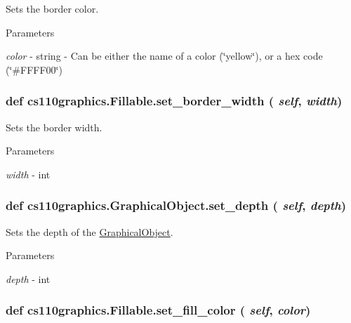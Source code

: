 Sets the border color. 
\begin{DoxyParams}{Parameters}
\item[{\em color}]-\/ string -\/ Can be either the name of a color (\char`\"{}yellow\char`\"{}), or a hex code (\char`\"{}\#FFFF00\char`\"{}) \end{DoxyParams}
\hypertarget{classcs110graphics_1_1Fillable_a09f05462cb2ed38fdccb244340f05b2b}{
\subsubsection[{set\_\-border\_\-width}]{\setlength{\rightskip}{0pt plus 5cm}def cs110graphics.Fillable.set\_\-border\_\-width ( {\em self}, \/   {\em width})}}
\label{classcs110graphics_1_1Fillable_a09f05462cb2ed38fdccb244340f05b2b}


Sets the border width. 
\begin{DoxyParams}{Parameters}
\item[{\em width}]-\/ int \end{DoxyParams}
\hypertarget{classcs110graphics_1_1GraphicalObject_a20d76d4ee4419c3065d61deb6cbc6700}{
\subsubsection[{set\_\-depth}]{\setlength{\rightskip}{0pt plus 5cm}def cs110graphics.GraphicalObject.set\_\-depth ( {\em self}, \/   {\em depth})}}
\label{classcs110graphics_1_1GraphicalObject_a20d76d4ee4419c3065d61deb6cbc6700}


Sets the depth of the \hyperlink{classcs110graphics_1_1GraphicalObject}{GraphicalObject}. 
\begin{DoxyParams}{Parameters}
\item[{\em depth}]-\/ int \end{DoxyParams}
\hypertarget{classcs110graphics_1_1Fillable_a4f24c7186c8d057e42a0209eb1d56be7}{
\subsubsection[{set\_\-fill\_\-color}]{\setlength{\rightskip}{0pt plus 5cm}def cs110graphics.Fillable.set\_\-fill\_\-color ( {\em self}, \/   {\em color})}}
\label{classcs110graphics_1_1Fillable_a4f24c7186c8d057e42a0209eb1d56be7}



